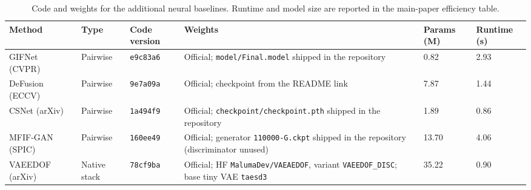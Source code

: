 \begin{table}[htbp]
\caption{Code and weights for the additional neural baselines. Runtime and model size are reported in the main-paper efficiency table.}
\label{tab:deploy}
\footnotesize
\begin{tabular}{@{}p{1.9cm}p{1.3cm}p{1.4cm}p{3.5cm}p{1.3cm}p{1.5cm}@{}}
\toprule
Method & Type & Code version & Weights & Params (M) & Runtime (s) \\
\midrule
GIFNet (CVPR)~\cite{cheng2025gifnet} & Pairwise & \texttt{e9c83a6} & Official; \texttt{model/Final.model} shipped in the repository & 0.82 & 2.93 \\
DeFusion (ECCV)~\cite{liang2022defusion} & Pairwise & \texttt{9e7a09a} & Official; checkpoint from the README link & 7.87 & 1.44 \\
CSNet (arXiv)~\cite{csnet2026} & Pairwise & \texttt{1a494f9} & Official; \texttt{checkpoint/\allowbreak checkpoint.pth} shipped in the repository & 1.89 & 0.86 \\
MFIF-GAN (SPIC)~\cite{wang2021mfifgan} & Pairwise & \texttt{160ee49} & Official; generator \texttt{110000-G.ckpt} shipped in the repository (discriminator unused) & 13.70 & 4.06 \\
VAEEDOF (arXiv)~\cite{vaeedof2025} & Native stack & \texttt{78cf9ba} & Official; HF \texttt{MalumaDev/VAEAEDOF}, variant \texttt{VAEEDOF\_DISC}; base tiny VAE \texttt{taesd3} & 35.22 & 0.90 \\
\bottomrule
\end{tabular}
\end{table}
